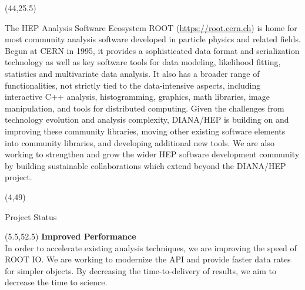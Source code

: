 \documentclass[final]{beamer}
\begin{document}
\begin{frame}{}
\begin{textblock}{38.0}(44,25.5)
\begin{block}{The HEP Analysis Software Ecosystem}
ROOT (\href{https://root.cern.ch}{https://root.cern.ch}) is
home for most community analysis
software developed in particle physics and related fields. Begun at CERN in 1995,
it provides a sophisticated data format and serialization technology
as well as key software tools for
data modeling, likelihood fitting, statistics and
multivariate data analysis. It also has a broader range of
functionalities, not strictly tied to the data-intensive aspects,
including interactive C++ analysis, histogramming,
graphics, math libraries, image manipulation,
and tools for distributed computing.
Given the challenges from technology evolution and analysis complexity,
DIANA/HEP is building on and improving these
community libraries, moving other existing software elements into
community libraries, and developing additional new tools. We are also working to strengthen and grow the wider HEP software development community by building sustainable collaborations which extend beyond the DIANA/HEP project.
\end{block}
\end{textblock}





\begin{textblock}{78.0}(4,49)
\begin{block}{Project Status}
\end{block}
\end{textblock}

\begin{textblock}{22.5}(5.5,52.5)
\textcolor{mybluelabel}{\bf Improved Performance} \\
In order to accelerate existing analysis techniques, we are improving the speed of ROOT IO.
We are working to modernize the API
and provide faster data rates for simpler objects.
By decreasing the time-to-delivery of results, we aim to decrease the time to science.
\end{textblock}


\end{frame}
\end{document}
